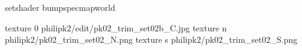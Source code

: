 setshader bumpspecmapworld

texture 0 philipk2/edit/pk02_trim_set02b_C.jpg
texture n philipk2/pk02_trim_set02_N.png
texture s philipk2/pk02_trim_set02_S.png

